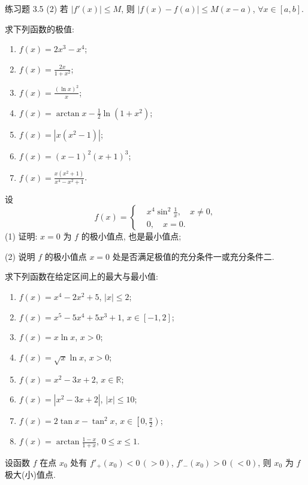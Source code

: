 \begin{exblock}{练习题 3.5}
  (2) 若 $|f'(x)|\leqslant M$, 则 $|f(x)-f(a)|\leqslant M(x-a)$, $\forall x\in[a,b]$.

  \item 求下列函数的极值:
  \begin{enumerate}[label=(\arabic*)]
    \item $f(x)=2x^{3}-x^{4}$;
    \item $f(x)=\frac{2x}{1+x^{2}}$;
    \item $f(x)=\frac{(\ln x)^{2}}{x}$;
    \item $f(x)=\arctan x-\frac{1}{2}\ln(1+x^{2})$;
    \item $f(x)=|x(x^{2}-1)|$;
    \item $f(x)=(x-1)^{2}(x+1)^{3}$;
    \item $f(x)=\frac{x(x^{2}+1)}{x^{4}-x^{2}+1}$.
  \end{enumerate}

  \item 设
  \[
  f(x)=\left\{
  \begin{aligned}
  &x^{4}\sin^{2}\frac{1}{x},\quad x\neq 0,\\
  &0,\quad x=0.
  \end{aligned}
  \right.
\]
  (1) 证明: $x=0$ 为 $f$ 的极小值点, 也是最小值点;

  (2) 说明 $f$ 的极小值点 $x=0$ 处是否满足极值的充分条件一或充分条件二.

  \item 求下列函数在给定区间上的最大与最小值:
  \begin{enumerate}[label=(\arabic*)]
    \item $f(x)=x^{4}-2x^{2}+5$, $|x|\leqslant 2$;
    \item $f(x)=x^{5}-5x^{4}+5x^{3}+1$, $x\in[-1,2]$;
    \item $f(x)=x\ln x$, $x>0$;
    \item $f(x)=\sqrt{x}\ln x$, $x>0$;
    \item $f(x)=x^{2}-3x+2$, $x\in\mathbb{R}$;
    \item $f(x)=|x^{2}-3x+2|$, $|x|\leqslant 10$;
    \item $f(x)=2\tan x-\tan^{2}x$, $x\in\left[0,\frac{\pi}{2}\right)$;
    \item $f(x)=\arctan\frac{1-x}{1+x}$, $0\leqslant x\leqslant 1$.
  \end{enumerate}

  \item 设函数 $f$ 在点 $x_{0}$ 处有 $f'_{+}(x_{0})<0\,(>0)$, $f'_{-}(x_{0})>0\,(<0)$, 则 $x_{0}$ 为 $f$ 极大(小)值点.


\end{exblock}

